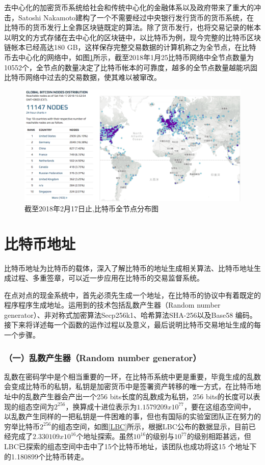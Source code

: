 		去中⼼化的加密货币系统给社会和传统中⼼化的⾦融体系以及政府带来了重⼤的冲击，Satoshi Nakamoto建构了一个不需要经过中央银行发行货币的货币系统，在比特币的货币发行上全靠区块链既定的算法。除了货币发行，也将交易记录的帐本以明文的方式存储在去中心化的区块链中，以比特币为例，现今完整的比特币区块链帐本已经高达180 GB，这样保存完整交易数据的计算机称之为全节点，在比特币去中心化的网络中，如图\ref{bitcoinfullnode}所示，截至2018年1月25比特币网络中全节点数量为10552个\supercite{bitcoinfullnode}，全节点的数量决定了比特币帐本的可靠度，越多的全节点数量越能巩固⽐特币网络中过去的交易数据，使其难以被窜改。

		\begin{figure}
			\centering
			\includegraphics[width = .9\textwidth]{bitcoinfullnode.png}
			\caption{截至2018年2月17日止,⽐特币全节点分布图\supercite{bitcoinfullnode}}\label{bitcoinfullnode}
		\end{figure}


		\section{比特币地址}
		⽐特币地址为⽐特币的载体，深⼊了解⽐特币的地址⽣成相关算法、⽐特币地址⽣成过程、多重签章，可以近⼀步应⽤在比特币的交易监督系统。
		
		在点对点的现金系统中，首先必须先生成一个地址，在比特币的协议中有着既定的程序程序生成地址。运用到的技术包括乱数产生器（Random number generator）、非对称式加密算法Secp256k1\supercite{johnson2001elliptic}、哈希算法SHA-256\supercite{DBLP:conf/fse/KhovratovichRS12}以及Base58 编码\supercite{Base58}。接下来将详述每一个函数的运作过程以及意义，最后说明比特币交易地址生成的每一个步骤。
			
				\subsubsection{（一）乱数产生器（Random number generator）}
				乱数在密码学中是个相当重要的一环，在比特币系统中更是重要，毕竟生成的乱数会变成比特币的私钥，私钥是加密货币中是签署资产转移的唯一方式，在比特币地址中的乱数产生器会产出一个256 bits长度的乱数成为私钥，256 bits的长度可以表现的组态空间为$2^{256}$，换算成十进位表示为$1.1579209x10^{77}$，要在这组态空间中，以乱数产生同样的一把私钥是一件困难的事，但也有国际的实验室\supercite{TheLargeBitcoinCollider}团队正在努力的穷举比特币$2^{256}$的组态空间，如图\ref{LBC}所示，根据LBC公布的数据显示，目前已经完成了$2.330109x10^{16}$个地址探索。虽然$10^{16}$的级别与$10^{77}$的级别相距甚远，但LBC已探索的组态空间中击中了15个比特币地址，该团队也成功将这15 个地址下的1.180899个比特币转走。

